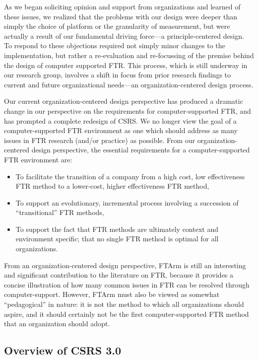 As we began soliciting opinion and support from organizations and learned
of these issues, we realized that the problems with our design were deeper
than simply the choice of platform or the granularity of measurement, but
were actually a result of our fundamental driving force---a
principle-centered design.  To respond to these objections required not
simply minor changes to the implementation, but rather a re-evaluation and
re-focussing of the premise behind the design of computer supported FTR.
This process, which is still underway in our research group, involves a
shift in focus from prior research findings to current and future
organizational needs---an organization-centered design process.

Our current organization-centered design perspective has produced a
dramatic change in our perspective on the requirements for
computer-supported FTR, and has prompted a complete redesign of CSRS.
We no longer view the goal of a computer-supported FTR environment as one
which should address as many issues in FTR research (and/or practice) as
possible.  From our organization-centered design perspective, the essential
requirements for a computer-supported FTR environment are:

\begin{itemize}
\item To facilitate the transition of a company from a high cost, low
  effectiveness FTR method to a lower-cost, higher effectiveness FTR method,
  
\item To support an evolutionary, incremental process involving a
  succession of ``transitional'' FTR methods,
  
\item To support the fact that FTR methods are ultimately context and
  environment specific; that no single FTR method is optimal for all
  organizations.
\end{itemize}

From an organization-centered design perspective, FTArm is still an
interesting and significant contribution to the literature on FTR, because
it provides a concise illustration of how many common issues in FTR can be
resolved through computer-support.  However, FTArm must also be viewed as
somewhat ``pedagogical'' in nature: it is not the method to which all
organizations should aspire, and it should certainly not be the first
computer-supported FTR method that an organization should adopt.

\subsection{Overview of CSRS 3.0}

